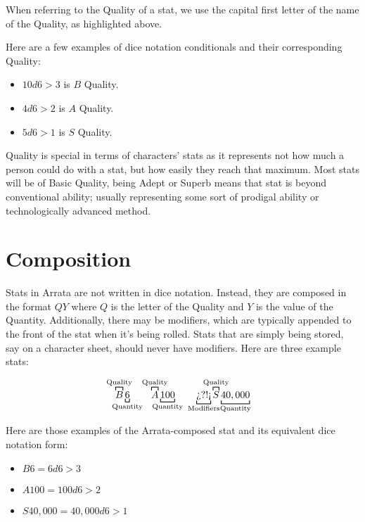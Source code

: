 \documentclass[../main.tex]{subfiles}
\begin{document}
    When referring to the Quality of a stat, we use the capital first letter of the name of the Quality, as highlighted above.

    Here are a few examples of dice notation conditionals and their corresponding Quality:

    \begin{itemize}
        \item $10d6>3$ is $B$ Quality.
        \item $4d6>2$ is $A$ Quality.
        \item $5d6>1$ is $S$ Quality.
    \end{itemize}

    Quality is special in terms of characters' stats as it represents not how much a person could do with a stat, but how easily they reach that maximum. Most stats will be of Basic Quality, being Adept or Superb means that stat is beyond conventional ability; usually representing some sort of prodigal ability or technologically advanced method.

    \section{Composition}

    Stats in Arrata are not written in dice notation. Instead, they are composed in the format $QY$ where $Q$ is the letter of the Quality and $Y$ is the value of the Quantity. Additionally, there may be modifiers, which are typically appended to the front of the stat when it's being rolled. Stats that are simply being stored, say on a character sheet, should never have modifiers. Here are three example stats:

    \begin{equation*}
        \overbracket[0.75pt]{B}^{\mathclap{\text{Quality}}}
        \underbracket[0.75pt]{6}_{\mathclap{\text{Quantity}}} \quad \quad
        \overbracket[0.75pt]{A}^{\mathclap{\text{Quality}}}
        \underbracket[0.75pt]{100}_{\mathclap{\text{Quantity}}} \quad \quad
        \underbracket[0.75pt]{\text{?`?!!`}}_{\mathclap{\text{Modifiers}}}
        \overbracket[0.75pt]{S}^{\mathclap{\text{Quality}}}
        \underbracket[0.75pt]{40,000}_{\mathclap{\text{Quantity}}}
    \end{equation*}

    Here are those examples of the Arrata-composed stat and its equivalent dice notation form:

    \begin{itemize}
        \item $B6 = 6d6>3$
        \item $A100 = 100d6>2$
        \item $S40,000 = 40,000d6>1$
    \end{itemize}
\end{document}
